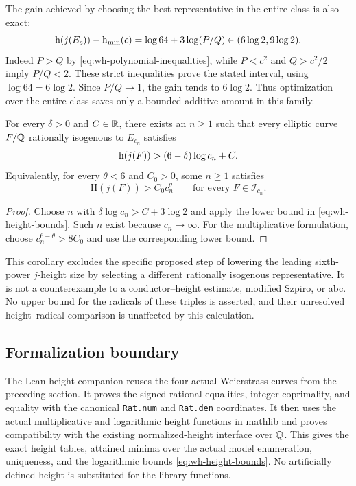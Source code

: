The gain achieved by choosing the best representative in the
entire class is also exact:
\begin{equation}\label{eq:wh-bounded-gain}
 \mathrm h(j(E_c))-\mathrm h_{\min}(c)
   =\log64+3\log(P/Q)\in(6\log2,9\log2).
\end{equation}
Indeed $P>Q$ by \eqref{eq:wh-polynomial-inequalities}, while
$P<c^2$ and $Q>c^2/2$ imply $P/Q<2$. These strict inequalities
prove the stated interval, using $\log64=6\log2$.
Since $P/Q\to1$, the gain tends to $6\log2$.
Thus optimization over the entire class saves only a bounded
additive amount in this family.

\begin{corollary}\label{cor:wh-no-leading-exponent-saving}
For every $\delta>0$ and $C\in\mathbb R$, there exists an $n\ge1$ such
that every elliptic curve $F/\mathbb Q$ rationally isogenous to $E_{c_n}$
satisfies
\[
 \mathrm h(j(F))>(6-\delta)\log c_n+C.
\]
Equivalently, for every $\theta<6$ and $C_0>0$, some $n\ge1$
satisfies
\[
 \mathrm H(j(F))>C_0c_n^\theta
 \qquad\text{for every }F\in\mathcal I_{c_n}.
\]
\end{corollary}

\begin{proof}
Choose $n$ with $\delta\log c_n>C+3\log2$ and apply the lower
bound in \eqref{eq:wh-height-bounds}. Such $n$ exist because
$c_n\to\infty$. For the multiplicative formulation, choose
$c_n^{6-\theta}>8C_0$ and use the corresponding lower bound.
\end{proof}

This corollary excludes the specific proposed step of lowering the
leading sixth-power $j$-height size by selecting a different rationally
isogenous representative. It is not a counterexample to a
conductor--height estimate, modified Szpiro, or abc. No upper bound
for the radicals of these triples is asserted, and their unresolved
height--radical comparison is unaffected by this calculation.

\subsection{Formalization boundary}

The Lean height companion reuses the four actual Weierstrass curves
from the preceding section.
It proves the signed rational equalities, integer coprimality, and
equality with the canonical \texttt{Rat.num} and \texttt{Rat.den}
coordinates. It then uses the actual multiplicative and logarithmic
height functions in mathlib and proves compatibility with the existing
normalized-height interface over $\mathbb Q$. This gives the exact height
tables, attained minima over the actual model enumeration,
uniqueness, and the logarithmic bounds
\eqref{eq:wh-height-bounds}. No artificially defined height is
substituted for the library functions.


